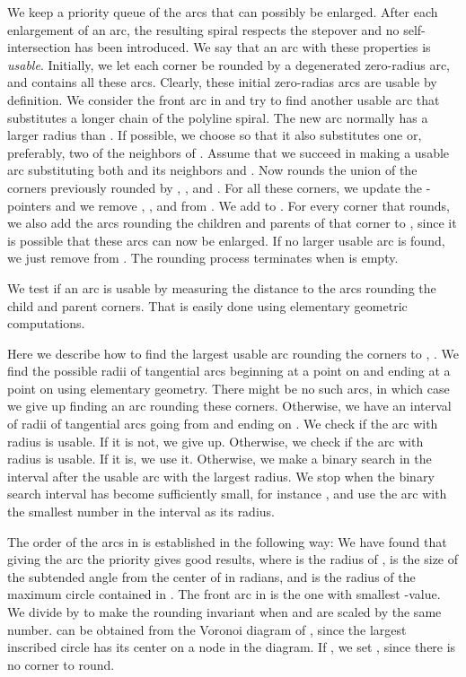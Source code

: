 \documentclass[3p]{elsarticle}
\begin{document}
We keep a priority queue  \cite{cormen2009} of the arcs that can possibly be
enlarged.
After each enlargement of an arc, the resulting spiral respects the stepover 
and no self-intersection has been introduced. We say that an arc with these properties is
\emph{usable}.
Initially, we let each corner be rounded by a
degenerated zero-radius arc, and  contains all these arcs.
Clearly, these initial zero-radias arcs are usable by definition.
We consider the front arc  in  and try to find another usable arc 
that substitutes a longer chain of the polyline spiral.
The new arc  normally has a larger radius than .
If possible, we choose  so that it also
substitutes one or, preferably, two of the neighbors of . Assume that we succeed
in making a usable arc  substituting both  and its neighbors  and .
Now  rounds the union of the corners previously rounded by , , and .
For all these corners, we update the -pointers
and we remove , , and  from .
We add  to . For every corner that  rounds,
we also add the arcs rounding the children and parents of that corner to ,
since it is possible that these arcs can now be enlarged.
If no larger usable arc  is found, we just remove  from .
The rounding process terminates when  is empty.

We test if an arc is usable by measuring the distance to the arcs
rounding the child and parent corners. That is easily done using elementary
geometric computations.

Here we describe how to find the largest usable arc rounding the corners
 to , . We find the possible radii of tangential arcs beginning at
a point on  and ending at a point on  using elementary geometry.
There might be no such arcs, in which case we give up
finding an arc rounding these corners.
Otherwise, we have an interval  of radii of tangential arcs
going from  and ending on .
We check if the arc with radius  is usable.
If it is not, we give up. Otherwise, we check if
the arc with radius  is usable. If it is, we use it. Otherwise, we
make a binary search in the interval 
after the usable arc with the largest radius. We stop when the binary search interval
has become sufficiently small, for instance , and use the arc
with the smallest number in the interval as its radius.

The order of the arcs in  is established in the following way:
We have found that giving the arc  the priority
 gives good results, where
 is the radius of ,  is the size of the subtended angle from the center of 
in radians, and
 is the radius of the maximum circle contained in .
The front arc in  is the one with smallest -value.
We divide by  to make the rounding invariant when  and  are scaled
by the same number.
 can be obtained from the Voronoi diagram of , since the largest inscribed circle
has its center on a node in the diagram.
If , we set , since there is no corner to round.
\end{document}
